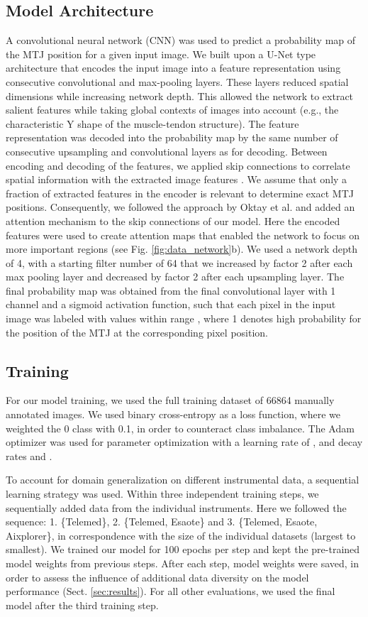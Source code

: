 \documentclass[journal,twoside,web]{ieeecolor}
\begin{document}
\subsection*{Model Architecture}
A convolutional neural network (CNN) was used to predict a probability map of the MTJ position for a given input image. We built upon a U-Net type architecture \cite{j:Ronneberger2015} that encodes the input image into a feature representation using consecutive convolutional and max-pooling layers. These layers reduced spatial dimensions while increasing network depth. This allowed the network to extract salient features while taking global contexts of images into account (e.g., the characteristic Y shape of the muscle-tendon structure). The feature representation was decoded into the probability map by the same number of consecutive upsampling and convolutional layers as for decoding. Between encoding and decoding of the features, we applied skip connections to correlate spatial information with the extracted image features \cite{j:Ronneberger2015}. We assume that only a fraction of extracted features in the encoder is relevant to determine exact MTJ positions. Consequently, we followed the approach by Oktay et al. \cite{j:Oktay2018} and added an attention mechanism to the skip connections of our model. Here the encoded features were used to create attention maps that enabled the network to focus on more important regions (see Fig. \ref{fig:data_network}b). We used a network depth of 4, with a starting filter number of 64 that we increased by factor 2 after each max pooling layer and decreased by factor 2 after each upsampling layer. The final probability map was obtained from the final convolutional layer with 1 channel and a sigmoid activation function, such that each pixel in the input image was labeled with values within range , where 1 denotes high probability for the position of the MTJ at the corresponding pixel position.

\subsection*{Training}
\label{sec:methods.train}
For our model training, we used the full training dataset of 66864 manually annotated images. We used binary cross-entropy as a loss function, where we weighted the 0 class with 0.1, in order to counteract class imbalance. The Adam optimizer was used for parameter optimization with a learning rate of , and decay rates  and .

To account for domain generalization on different instrumental data, a sequential learning strategy was used. Within three independent training steps, we sequentially added data from the individual instruments. Here we followed the sequence: 1. \{Telemed\}, 2. \{Telemed, Esaote\} and 3. \{Telemed, Esaote, Aixplorer\}, in correspondence with the size of the individual datasets (largest to smallest). We trained our model for 100 epochs per step and kept the pre-trained model weights from previous steps. After each step, model weights were saved, in order to assess the influence of additional data diversity on the model performance (Sect. \ref{sec:results}). For all other evaluations, we used the final model after the third training step.
\end{document}
